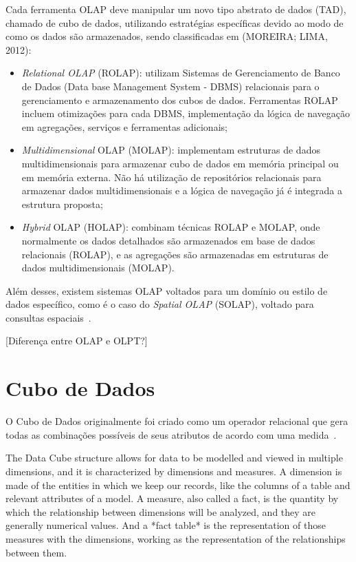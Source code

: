 Cada ferramenta OLAP deve manipular um novo tipo abstrato de dados (TAD), chamado de cubo de dados, utilizando estratégias específicas devido ao modo de como os dados são armazenados, sendo classificadas em (MOREIRA; LIMA, 2012):

\begin{itemize}
	\item \textit{Relational OLAP} (ROLAP): utilizam Sistemas de Gerenciamento de Banco de Dados (Data base Management System - DBMS) relacionais para o gerenciamento e armazenamento dos cubos de dados. Ferramentas ROLAP incluem otimizações para cada DBMS, implementação da lógica de navegação em agregações, serviços e ferramentas adicionais;
	\item \textit{Multidimensional} OLAP (MOLAP): implementam estruturas de dados multidimensionais para armazenar cubo de dados em memória principal ou em memória externa. Não há utilização de repositórios relacionais para armazenar dados multidimensionais e a lógica de navegação já é integrada a estrutura proposta;
	\item \textit{Hybrid} OLAP (HOLAP): combinam técnicas ROLAP e MOLAP, onde normalmente os dados detalhados são armazenados em base de dados relacionais (ROLAP), e as agregações são armazenadas em estruturas de dados multidimensionais (MOLAP).
\end{itemize}

Além desses, existem sistemas OLAP voltados para um domínio ou estilo de dados específico, como é o caso do \textit{Spatial OLAP} (SOLAP), voltado para consultas espaciais~\cite{viswanathanUsercentricSpatialData2014}.

{\color{red}
[Diferença entre OLAP e OLPT?]
}

\section{Cubo de Dados}
\label{ch:fun:cube}

O Cubo de Dados originalmente foi criado como um operador relacional que gera todas as combinações possíveis de seus atributos de acordo com uma medida~\cite{grayDataCubeRelational1996}.

The Data Cube structure allows for data to be modelled and viewed in multiple dimensions, and it is characterized by dimensions and measures.
A dimension is made of the entities in which we keep our records, like the columns of a table and relevant attributes of a model.
A measure, also called a fact, is the quantity by which the relationship between dimensions will be analyzed, and they are generally numerical values.
And a *fact table* is the representation of those measures with the dimensions, working as the representation of the relationships between them.

